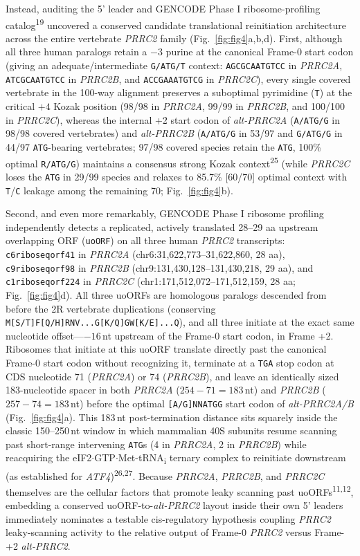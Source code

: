 \documentclass[10pt,letterpaper]{article}
\newcommand{\gene}[1]{\textit{#1}}
\newcommand{\refsup}[1]{\textsuperscript{#1}}
\begin{document}
Instead, auditing the 5' leader and GENCODE Phase I ribosome-profiling catalog\refsup{19} uncovered a conserved candidate translational reinitiation architecture across the entire vertebrate \gene{PRRC2} family (Fig.~\ref{fig:fig4}a,b,d). First, although all three human paralogs retain a $-3$ purine at the canonical Frame-0 start codon (giving an adequate/intermediate \texttt{G/ATG/T} context: \texttt{AGCGCAATGTCC} in \gene{PRRC2A}, \texttt{ATCGCAATGTCC} in \gene{PRRC2B}, and \texttt{ACCGAAATGTCG} in \gene{PRRC2C}), every single covered vertebrate in the 100-way alignment preserves a suboptimal pyrimidine (\texttt{T}) at the critical $+4$ Kozak position (98/98 in \gene{PRRC2A}, 99/99 in \gene{PRRC2B}, and 100/100 in \gene{PRRC2C}), whereas the internal +2 start codon of \gene{alt-PRRC2A} (\texttt{A/ATG/G} in 98/98 covered vertebrates) and \gene{alt-PRRC2B} (\texttt{A/ATG/G} in 53/97 and \texttt{G/ATG/G} in 44/97 \texttt{ATG}-bearing vertebrates; 97/98 covered species retain the \texttt{ATG}, 100\% optimal \texttt{R/ATG/G}) maintains a consensus strong Kozak context\refsup{25} (while \gene{PRRC2C} loses the \texttt{ATG} in 29/99 species and relaxes to 85.7\% [60/70] optimal context with \texttt{T}/\texttt{C} leakage among the remaining 70; Fig.~\ref{fig:fig4}b).

Second, and even more remarkably, GENCODE Phase I ribosome profiling independently detects a replicated, actively translated 28--29 aa upstream overlapping ORF (\texttt{uoORF}) on all three human \gene{PRRC2} transcripts: \texttt{c6riboseqorf41} in \gene{PRRC2A} (chr6:31,622,773--31,622,860, 28 aa), \texttt{c9riboseqorf98} in \gene{PRRC2B} (chr9:131,430,128--131,430,218, 29 aa), and \texttt{c1riboseqorf224} in \gene{PRRC2C} (chr1:171,512,072--171,512,159, 28 aa; Fig.~\ref{fig:fig4}d). All three uoORFs are homologous paralogs descended from before the 2R vertebrate duplications (conserving \texttt{M[S/T]F[Q/H]RNV...G[K/Q]GW[K/E]...Q}), and all three initiate at the exact same nucleotide offset---$-16$\,nt upstream of the Frame-0 start codon, in Frame +2. Ribosomes that initiate at this uoORF translate directly past the canonical Frame-0 start codon without recognizing it, terminate at a \texttt{TGA} stop codon at CDS nucleotide 71 (\gene{PRRC2A}) or 74 (\gene{PRRC2B}), and leave an identically sized 183-nucleotide spacer in both \gene{PRRC2A} ($254 - 71 = 183$\,nt) and \gene{PRRC2B} ($257 - 74 = 183$\,nt) before the optimal \texttt{[A/G]NNATGG} start codon of \gene{alt-PRRC2A/B} (Fig.~\ref{fig:fig4}a). This 183\,nt post-termination distance sits squarely inside the classic 150--250\,nt window in which mammalian 40S subunits resume scanning past short-range intervening \texttt{ATG}s (4 in \gene{PRRC2A}, 2 in \gene{PRRC2B}) while reacquiring the eIF2$\cdot$GTP$\cdot$Met-tRNA\textsubscript{i} ternary complex to reinitiate downstream (as established for \gene{ATF4})\refsup{26,27}. Because \gene{PRRC2A}, \gene{PRRC2B}, and \gene{PRRC2C} themselves are the cellular factors that promote leaky scanning past uoORFs\refsup{11,12}, embedding a conserved uoORF-to-\gene{alt-PRRC2} layout inside their own 5' leaders immediately nominates a testable cis-regulatory hypothesis coupling \gene{PRRC2} leaky-scanning activity to the relative output of Frame-0 \gene{PRRC2} versus Frame-+2 \gene{alt-PRRC2}.
\end{document}
